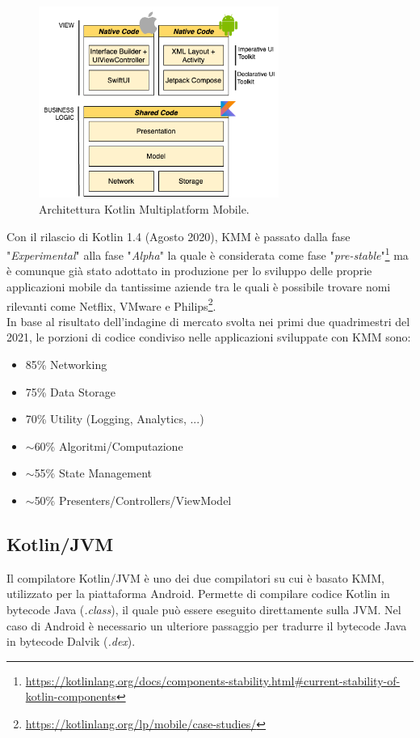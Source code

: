 \begin{figure}[H]
\centering
\includegraphics[width=0.7\textwidth]{img/tesi-8-kmm.drawio.png}
\caption{Architettura Kotlin Multiplatform Mobile.}
\label{stackKMM}
\end{figure}

Con il rilascio di Kotlin 1.4 (Agosto 2020), KMM è passato dalla fase "\textit{Experimental}" alla fase "\textit{Alpha}" la quale è considerata come fase "\textit{pre-stable}"\footnote{\url{https://kotlinlang.org/docs/components-stability.html\#current-stability-of-kotlin-components}} ma è comunque già stato adottato in produzione per lo sviluppo delle proprie applicazioni mobile da tantissime aziende tra le quali è possibile trovare nomi rilevanti come Netflix, VMware e Philips\footnote{\url{https://kotlinlang.org/lp/mobile/case-studies/}}.\\
In base al risultato dell'indagine di mercato svolta nei primi due quadrimestri del 2021\cite{kmm2}, le porzioni di codice condiviso nelle applicazioni sviluppate con KMM sono:
\begin{itemize}
    \item 85\% Networking
    \item 75\% Data Storage
    \item 70\% Utility (Logging, Analytics, ...)
    \item $\sim$60\% Algoritmi/Computazione
    \item $\sim$55\% State Management
    \item $\sim$50\% Presenters/Controllers/ViewModel
\end{itemize}

\subsection{Kotlin/JVM}
Il compilatore Kotlin/JVM è uno dei due compilatori su cui è basato KMM, utilizzato per la piattaforma Android. Permette di compilare codice Kotlin in bytecode Java (\textit{.class}), il quale può essere eseguito direttamente sulla JVM. Nel caso di Android è necessario un ulteriore passaggio per tradurre il bytecode Java in bytecode Dalvik (\textit{.dex}).

